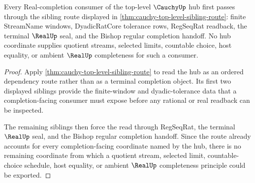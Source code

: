 \begin{theorem}
\label{thm:cauchy-top-level-real-completion-forward-route}
Every Real-completion consumer of the top-level $\CauchyUp$ hub first passes through the sibling route displayed in \autoref{thm:cauchy-top-level-sibling-route}: finite StreamName windows, DyadicRatCore tolerance rows, RegSeqRat readback, the terminal $\RealUp$ seal, and the Bishop regular completion handoff. No hub coordinate supplies quotient streams, selected limits, countable choice, host equality, or ambient $\RealUp$ completeness for such a consumer.
\end{theorem}
\begin{proof}
Apply \autoref{thm:cauchy-top-level-sibling-route} to read the hub as an ordered dependency route rather than as a terminal completion object. Its first two displayed siblings provide the finite-window and dyadic-tolerance data that a completion-facing consumer must expose before any rational or real readback can be inspected.

The remaining siblings then force the read through RegSeqRat, the terminal $\RealUp$ seal, and the Bishop regular completion handoff. Since the route already accounts for every completion-facing coordinate named by the hub, there is no remaining coordinate from which a quotient stream, selected limit, countable-choice schedule, host equality, or ambient $\RealUp$ completeness principle could be exported.
\end{proof}
